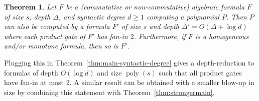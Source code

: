 \documentclass[11pt,a4paper]{article}
\newtheorem{theorem}{Theorem}
\newcommand{\poly}{\mathop{\mathrm{poly}}}
\begin{document}
\begin{theorem}
	\label{thm:prodfanin}
	Let $F$ be a (commutative or non-commutative) algebraic formula $F$ of size $s$, depth $\Delta$, and syntactic degree \(d \geq 1\) computing a polynomial $P$. Then $P$ can also be computed by a formula $F'$ of size $s$ and depth $\Delta' = O(\Delta + \log d)$ where each product gate of $F'$ has fan-in $2$. Furthermore, if $F$ is a homogeneous and/or monotone formula, then so is $F'$.
\end{theorem}

Plugging this in Theorem~\ref{thm:main-syntactic-degree} 
gives a depth-reduction to formulas of depth $O(\log d)$ and size $\poly(s)$ such that all product gates have fan-in at most $2$. A similar result can be obtained with a smaller blow-up in size by combining this statement with Theorem~\ref{thm:strongermain}.
\end{document}
